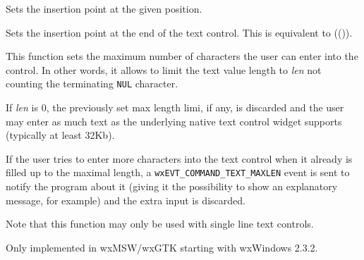 

\label{wxtextctrlsetinsertionpoint}


Sets the insertion point at the given position.



\label{wxtextctrlsetinsertionpointend}


Sets the insertion point at the end of the text control. This is equivalent
to (()).

\label{wxtextctrlsetmaxlength}


This function sets the maximum number of characters the user can enter into the
control. In other words, it allows to limit the text value length to {\it len}
not counting the terminating {\tt NUL} character.

If {\it len} is $0$, the previously set max length limi, if any, is discarded
and the user may enter as much text as the underlying native text control
widget supports (typically at least 32Kb).

If the user tries to enter more characters into the text control when it
already is filled up to the maximal length, a
{\tt wxEVT\_COMMAND\_TEXT\_MAXLEN} event is sent to notify the program about it
(giving it the possibility to show an explanatory message, for example) and the
extra input is discarded.

Note that this function may only be used with single line text controls.


Only implemented in wxMSW/wxGTK starting with wxWindows 2.3.2.

\label{wxtextctrlsetselection}


